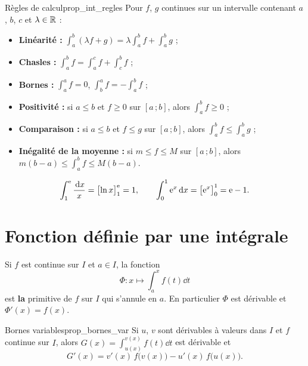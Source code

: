 \begin{propriete}{Règles de calcul}{prop_int_regles}
	Pour $f$, $g$ continues sur un intervalle contenant $a$, $b$, $c$ et
	$\lambda\in\mathbb{R}$ :
	\begin{itemize}[label=\textbullet]
		\item \textbf{Linéarité :}
		$\displaystyle\int_a^b(\lambda f+g)=\lambda\int_a^b f+\int_a^b g$ ;
		\item \textbf{Chasles :}
		$\displaystyle\int_a^b f=\int_a^c f+\int_c^b f$ ;
		\item \textbf{Bornes :}
		$\displaystyle\int_a^a f=0$, \quad
		$\displaystyle\int_b^a f=-\int_a^b f$ ;
		\item \textbf{Positivité :} si $a\leq b$ et $f\geq 0$ sur $[a\,;b]$, alors
		$\displaystyle\int_a^b f\geq 0$ ;
		\item \textbf{Comparaison :} si $a\leq b$ et $f\leq g$ sur $[a\,;b]$, alors
		$\displaystyle\int_a^b f\leq\int_a^b g$ ;
		\item \textbf{Inégalité de la moyenne :} si $m\leq f\leq M$ sur $[a\,;b]$,
		alors $m(b-a)\leq\displaystyle\int_a^b f\leq M(b-a)$.
	\end{itemize}
\end{propriete}

\begin{exemple}
	\[
	\int_1^{\mathrm{e}}\frac{\,\mathrm{d} x}{x}=\bigl[\ln x\bigr]_1^{\mathrm{e}}=1,
	\qquad
	\int_0^1\mathrm{e}^{x}\,\mathrm{d} x=\bigl[\mathrm{e}^{x}\bigr]_0^1=\mathrm{e}-1.
	\]
\end{exemple}


\section{Fonction définie par une intégrale}

\begin{theoreme}
	Si $f$ est continue sur $I$ et $a\in I$, la fonction
	\[
	\Phi:x\longmapsto\int_a^x f(t)\dd t
	\]
	est \textbf{la} primitive de $f$ sur $I$ qui s'annule en $a$. En
	particulier $\Phi$ est dérivable et $\Phi'(x)=f(x)$.
\end{theoreme}

\begin{propriete}{Bornes variables}{prop_bornes_var}
	Si $u$, $v$ sont dérivables à valeurs dans $I$ et $f$ continue sur $I$,
	alors $\displaystyle G(x)=\int_{u(x)}^{v(x)}f(t)\dd t$ est dérivable et
	\[
	G'(x)=v'(x)\,f\bigl(v(x)\bigr)-u'(x)\,f\bigl(u(x)\bigr).
	\]
\end{propriete}

